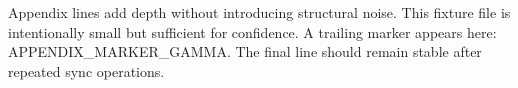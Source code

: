 Appendix lines add depth without introducing structural noise.
This fixture file is intentionally small but sufficient for confidence.
A trailing marker appears here: APPENDIX\_MARKER\_GAMMA.
The final line should remain stable after repeated sync operations.
